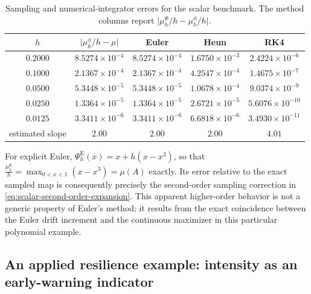 \documentclass[pdflatex,sn-mathphys-num]{sn-jnl}
\numberwithin{equation}{section}
\theoremstyle{thmstyleone}%
\theoremstyle{definition}
\theoremstyle{remark}
\begin{document}
\begin{table}[htbp]
    \centering
    \caption{Sampling and numerical-integrator errors for the scalar benchmark. The method columns report \(\bigl|\mu_h^\Psi/h-\mu_h^\phi/h\bigr|\).}
    \label{stab:integrators}
    \begin{tabular}{ccccc}
        \toprule
        \(h\)
        &
        \(\bigl|\mu_h^\phi/h-\mu\bigr|\)
        &
        Euler
        &
        Heun
        &
        RK4
        \\
        \midrule
        \(0.2000\) & \(8.5274\times10^{-4}\)
                   & \(8.5274\times10^{-4}\)
                   & \(1.6750\times10^{-3}\)
                   & \(2.4224\times10^{-6}\)\\
        \(0.1000\) & \(2.1367\times10^{-4}\)
                   & \(2.1367\times10^{-4}\)
                   & \(4.2547\times10^{-4}\)
                   & \(1.4675\times10^{-7}\)\\
        \(0.0500\) & \(5.3448\times10^{-5}\)
                   & \(5.3448\times10^{-5}\)
                   & \(1.0678\times10^{-4}\)
                   & \(9.0374\times10^{-9}\)\\
        \(0.0250\) & \(1.3364\times10^{-5}\)
                   & \(1.3364\times10^{-5}\)
                   & \(2.6721\times10^{-5}\)
                   & \(5.6076\times10^{-10}\)\\
        \(0.0125\) & \(3.3411\times10^{-6}\)
                   & \(3.3411\times10^{-6}\)
                   & \(6.6818\times10^{-6}\)
                   & \(3.4930\times10^{-11}\)\\
        \midrule
        estimated slope
                   & \(2.00\) & \(2.00\) & \(2.00\) & \(4.01\)\\
        \bottomrule
    \end{tabular}
\end{table}

For explicit Euler,
    $\Psi_h^{\mathrm E}(x)=x+h(x-x^3)$,
so that
    $\frac{\mu_h^{\mathrm E}}h
    =
    \max_{0<x<1}(x-x^3)
    =
    \mu(A)$
exactly. Its error relative to the exact sampled map is consequently precisely the second-order sampling correction in \eqref{eq:scalar-second-order-expansion}. This apparent higher-order behavior is not a generic property of Euler's method; it results from the exact coincidence between the Euler drift increment and the continuous maximizer in this particular polynomial example.

\subsection{An applied resilience example: intensity as an early-warning indicator}
\label{subsec:grazing}
\end{document}
